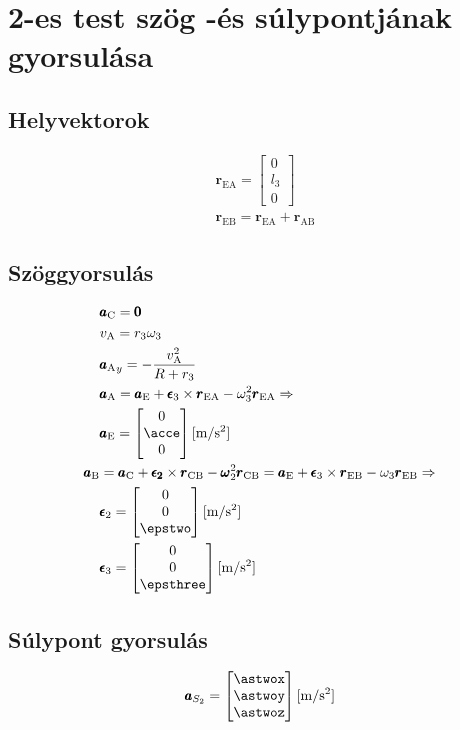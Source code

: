\section{2-es test szög -és súlypontjának gyorsulása}

\subsection{Helyvektorok}
\begin{align}
	&\pmb{r}_\text{EA} = 
	\begin{bmatrix}
		0 \\ l_3 \\ 0
	\end{bmatrix} \\
	&\pmb{r}_\text{EB} = \pmb{r}_\text{EA} + \pmb{r}_\text{AB}
\end{align}

\subsection{Szöggyorsulás}
\begin{align}
	&\pmb{a}_\text{C} = \pmb{0} \\
	&v_\text{A} = r_3\omega_3 \\
	&{\pmb{a}_\text{A}}_y = - \frac{v_\text{A}^2}{R+r_3} \\
	&\pmb{a}_\text{A} = \pmb{a}_\text{E} + \pmb{\epsilon}_3 \times \pmb{r}_\text{EA} - \omega_3^2\pmb{r}_\text{EA} \Rightarrow \\
	&\pmb{a}_\text{E} =
	\begin{bmatrix}
		0 \\ \acce \\ 0
	\end{bmatrix} \siunit{}{\meter\per\second^2} \\
	\pmb{a}_\text{B} 
	&= \pmb{a}_\text{C} + \pmb{\epsilon_2} \times \pmb{r}_\text{CB} - \pmb{\omega}_2^2\pmb{r}_\text{CB}
	= \pmb{a}_\text{E} + \pmb{\epsilon}_3 \times \pmb{r}_\text{EB} - \omega_3\pmb{r}_\text{EB} \Rightarrow\\
	&\pmb{\epsilon}_2 =
	\begin{bmatrix}
		0 \\ 0 \\ \epstwo
	\end{bmatrix} \siunit{}{\m\per\second^2}\\
	&\pmb{\epsilon}_3 =
	\begin{bmatrix}
		0 \\ 0 \\ \epsthree
	\end{bmatrix} \siunit{}{\m\per\second^2}\\
\end{align}

\subsection{Súlypont gyorsulás}
\begin{align}
	\pmb{a}_{S_2} =
	\begin{bmatrix}
		\astwox \\ \astwoy \\ \astwoz
	\end{bmatrix} \siunit{}{\m\per\second^2}\\
\end{align}
